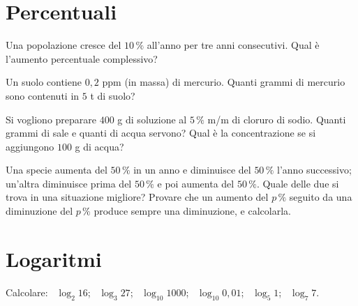\section{Percentuali}

\begin{esercizio}[\liv{2}]
Una popolazione cresce del $10\,\%$ all'anno per tre anni consecutivi. Qual \`e l'aumento percentuale complessivo?
\end{esercizio}

\begin{esercizio}[\liv{2}]
Un suolo contiene $0{,}2$ ppm (in massa) di mercurio. Quanti grammi di mercurio sono contenuti in $5$ t di suolo?
\end{esercizio}

\begin{esercizio}[\liv{2}]
Si vogliono preparare $400$ g di soluzione al $5\,\%$ m/m di cloruro di sodio. Quanti grammi di sale e quanti di acqua servono? Qual \`e la concentrazione se si aggiungono $100$ g di acqua?
\end{esercizio}

\begin{esercizio}[\liv{3}]
Una specie aumenta del $50\,\%$ in un anno e diminuisce del $50\,\%$ l'anno successivo; un'altra diminuisce prima del $50\,\%$ e poi aumenta del $50\,\%$. Quale delle due si trova in una situazione migliore? Provare che un aumento del $p\,\%$ seguito da una diminuzione del $p\,\%$ produce sempre una diminuzione, e calcolarla.
\end{esercizio}

\section{Logaritmi}

\begin{esercizio}[\liv{1}]
Calcolare: \ $\log_2 16$; \ $\log_3 27$; \ $\log_{10}1000$; \ $\log_{10}0{,}01$; \ $\log_5 1$; \ $\log_7 7$.
\end{esercizio}

